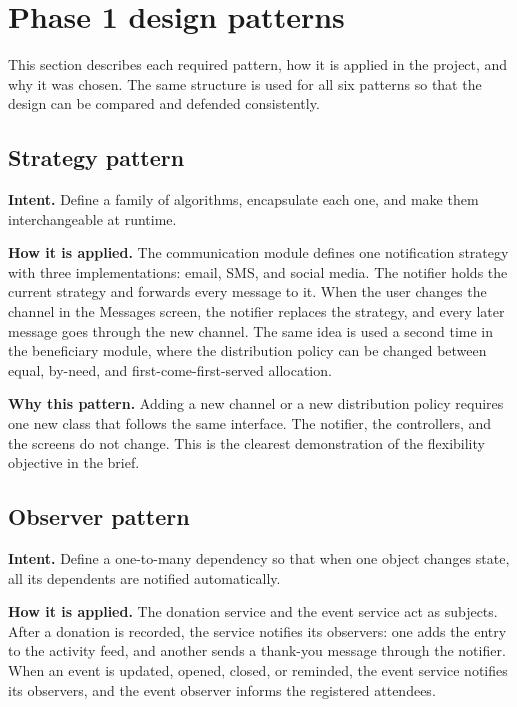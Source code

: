 \section{Phase 1 design patterns}

This section describes each required pattern, how it is applied in the project, and why it was chosen. The same structure is used for all six patterns so that the design can be compared and defended consistently.

\subsection{Strategy pattern}

\textbf{Intent.} Define a family of algorithms, encapsulate each one, and make them interchangeable at runtime.

\textbf{How it is applied.} The communication module defines one notification strategy with three implementations: email, SMS, and social media. The notifier holds the current strategy and forwards every message to it. When the user changes the channel in the Messages screen, the notifier replaces the strategy, and every later message goes through the new channel. The same idea is used a second time in the beneficiary module, where the distribution policy can be changed between equal, by-need, and first-come-first-served allocation.

\textbf{Why this pattern.} Adding a new channel or a new distribution policy requires one new class that follows the same interface. The notifier, the controllers, and the screens do not change. This is the clearest demonstration of the flexibility objective in the brief.

\subsection{Observer pattern}

\textbf{Intent.} Define a one-to-many dependency so that when one object changes state, all its dependents are notified automatically.

\textbf{How it is applied.} The donation service and the event service act as subjects. After a donation is recorded, the service notifies its observers: one adds the entry to the activity feed, and another sends a thank-you message through the notifier. When an event is updated, opened, closed, or reminded, the event service notifies its observers, and the event observer informs the registered attendees.

